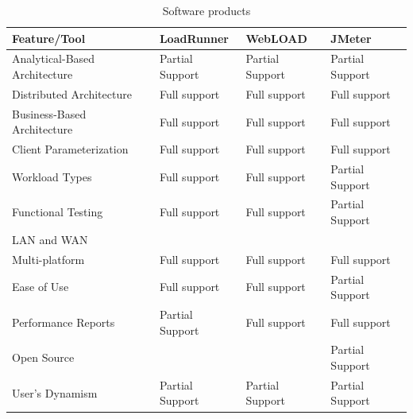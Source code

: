 \documentclass[espaco=umemeio,chapter=TITLE,twoside,openright]{abnt}
\begin{document}
\begin{table}[h]
\centering
\caption{Software products}
\label{tab: tabtool2}
\begin{tabular}{|l|l|l|l|}
\hline
\rowcolor[HTML]{EFEFEF}
\textbf{Feature/Tool}         & \textbf{LoadRunner} & \textbf{WebLOAD} & \textbf{JMeter} \\ \hline
\cellcolor[HTML]{EFEFEF}Analytical-Based Architecture & Partial Support      & Partial Support   & Partial Support  \\ \hline
\cellcolor[HTML]{EFEFEF}Distributed Architecture      & Full support        & Full support     & Full support    \\ \hline
\cellcolor[HTML]{EFEFEF}Business-Based Architecture   & Full support        & Full support     & Full support    \\ \hline
\cellcolor[HTML]{EFEFEF}Client Parameterization       & Full support        & Full support     & Full support    \\ \hline
\cellcolor[HTML]{EFEFEF}Workload Types                & Full support        & Full support     & Partial Support  \\ \hline
\cellcolor[HTML]{EFEFEF}Functional Testing            & Full support        & Full support     & Partial Support  \\ \hline
\cellcolor[HTML]{EFEFEF}LAN and WAN                   &                     &                  &                 \\ \hline
\cellcolor[HTML]{EFEFEF}Multi-platform                & Full support        & Full support     & Full support    \\ \hline
\cellcolor[HTML]{EFEFEF}Ease of Use                   & Full support        & Full support     & Partial Support  \\ \hline
\cellcolor[HTML]{EFEFEF}Performance Reports           & Partial Support      & Full support     & Full support    \\ \hline
\cellcolor[HTML]{EFEFEF}Open Source                   &                     &                  & Partial Support  \\ \hline
\cellcolor[HTML]{EFEFEF}User’s Dynamism               & Partial Support      & Partial Support   & Partial Support  \\ \hline
\end{tabular}
\end{table}
\end{document}
